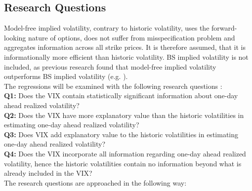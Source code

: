 \subsection{Research Questions}\label{sec:41aHypothesis}
Model-free implied volatility, contrary to historic volatility, uses the forward-looking nature of options, does not suffer from misspecification problem and aggregates information across all strike prices. It is therefore assumed, that it is informationally more efficient than historic volatility. \ac{BS} implied volatility is not included, as previous research found that model-free implied volatility outperforms \ac{BS} implied volatility (e.g. \textcite{jiang2003, bakanova2010}).\\
The regressions will be examined with the following research questions :\\
\textbf{Q1:} Does the \ac{VIX} contain statistically significant information about one-day ahead realized volatility?\\
\textbf{Q2:} Does the \ac{VIX} have more explanatory value than the historic volatilities in estimating one-day ahead realized volatility?\\
\textbf{Q3:} Does \ac{VIX} add explanatory value to the historic volatilities in estimating one-day ahead realized volatility?\\
\textbf{Q4:} Does the \ac{VIX} incorporate all information regarding one-day ahead realized volatility, hence the historic volatilities contain no information beyond what is already included in the \ac{VIX}?\\
The research questions are approached in the following way:\\

